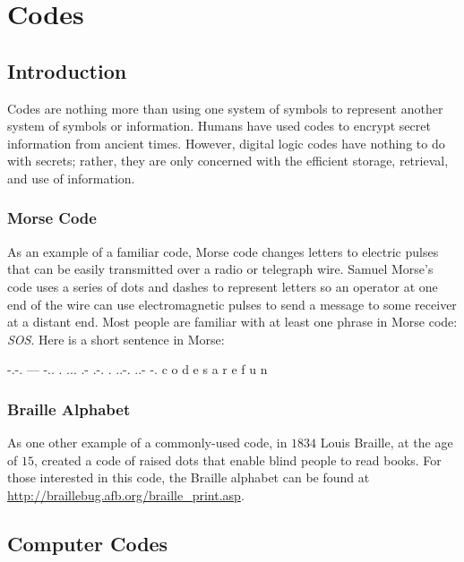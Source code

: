 \section{Codes}
\label{MO:sec:codes}

\subsection{Introduction}
\label{MO:sub:codes_introduction}

Codes are nothing more than using one system of symbols to represent another system of symbols or information. Humans have used codes to encrypt secret information from ancient times. However, digital logic codes have nothing to do with secrets; rather, they are only concerned with the efficient storage, retrieval, and use of information. 

\subsubsection{Morse Code}
\label{MO:subsub:morse_code}

As an example of a familiar code, Morse code changes letters to electric pulses that can be easily transmitted over a radio or telegraph wire. Samuel Morse's code uses a series of dots and dashes to represent letters so an operator at one end of the wire can use electromagnetic pulses to send a message to some receiver at a distant end. Most people are familiar with at least one phrase in Morse code: \emph{SOS}. Here is a short sentence in Morse: 

\begin{binDisp}[commandchars=~\[\]]
  -.-. --- -.. . ...   .- .-. .   ..-. ..- -.
   c    o   d  e  s    a   r  e    f    u  n
\end{binDisp}

\subsubsection{Braille Alphabet}
\label{MO:subsub:braille_alphabet}

As one other example of a commonly-used code, in $ 1834 $ Louis Braille, at the age of $ 15 $, created a code of raised dots that enable blind people to read books. For those interested in this code, the Braille alphabet can be found at \url{http://braillebug.afb.org/braille_print.asp}. 

\subsection{Computer Codes}
\label{MO:sub:computer_codes}

